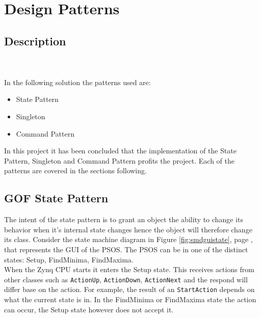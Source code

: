 \section{Design Patterns} \label{designpatterns}

\subsection{Description}

\noindent{}\\\\

In the following solution the patterns used are:
\begin{itemize}
	\item State Pattern
	\item Singleton
	\item Command Pattern
\end{itemize}

In this project it has been concluded that the implementation of the State Pattern, Singleton and Command Pattern profits the project. Each of the patterns are covered in the sections following.

\clearpage

\subsection{GOF State Pattern}\label{dp:state}
The intent of the state pattern is to grant an object the ability to change its behavior when it's internal state changes hence the object will therefore change its class. Consider the state machine diagram in Figure \ref{fig:smdguistate}, page \pageref{fig:smdguistate}, that represents the GUI of the PSOS. The PSOS can be in one of the distinct states: Setup, FindMinima, FindMaxima. \\

When the Zynq CPU starts it enters the Setup state. This receives actions from other classes such as \texttt{ActionUp}, \texttt{ActionDown}, \texttt{ActionNext} and the respond will differ base on the action. For example, the result of an \texttt{StartAction} depends on what the current state is in. In the FindMinima or FindMaxima state the action can occur, the Setup state however does not accept it.\\

